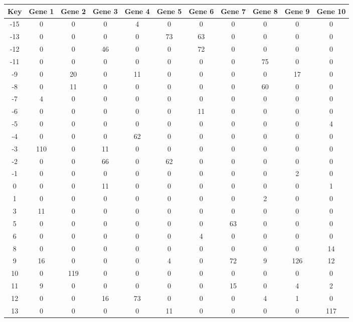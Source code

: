 \begin{tabular}{|c|c|c|c|c|c|c|c|c|c|c|}
\hline
Key & Gene 1 & Gene 2 & Gene 3 & Gene 4 & Gene 5 & Gene 6 & Gene 7 & Gene 8 & Gene 9 & Gene 10 \\
\hline
-15 & 0 & 0 & 0 & 4 & 0 & 0 & 0 & 0 & 0 & 0 \\
-13 & 0 & 0 & 0 & 0 & 73 & 63 & 0 & 0 & 0 & 0 \\
-12 & 0 & 0 & 46 & 0 & 0 & 72 & 0 & 0 & 0 & 0 \\
-11 & 0 & 0 & 0 & 0 & 0 & 0 & 0 & 75 & 0 & 0 \\
-9 & 0 & 20 & 0 & 11 & 0 & 0 & 0 & 0 & 17 & 0 \\
-8 & 0 & 11 & 0 & 0 & 0 & 0 & 0 & 60 & 0 & 0 \\
-7 & 4 & 0 & 0 & 0 & 0 & 0 & 0 & 0 & 0 & 0 \\
-6 & 0 & 0 & 0 & 0 & 0 & 11 & 0 & 0 & 0 & 0 \\
-5 & 0 & 0 & 0 & 0 & 0 & 0 & 0 & 0 & 0 & 4 \\
-4 & 0 & 0 & 0 & 62 & 0 & 0 & 0 & 0 & 0 & 0 \\
-3 & 110 & 0 & 11 & 0 & 0 & 0 & 0 & 0 & 0 & 0 \\
-2 & 0 & 0 & 66 & 0 & 62 & 0 & 0 & 0 & 0 & 0 \\
-1 & 0 & 0 & 0 & 0 & 0 & 0 & 0 & 0 & 2 & 0 \\
0 & 0 & 0 & 11 & 0 & 0 & 0 & 0 & 0 & 0 & 1 \\
1 & 0 & 0 & 0 & 0 & 0 & 0 & 0 & 2 & 0 & 0 \\
3 & 11 & 0 & 0 & 0 & 0 & 0 & 0 & 0 & 0 & 0 \\
5 & 0 & 0 & 0 & 0 & 0 & 0 & 63 & 0 & 0 & 0 \\
6 & 0 & 0 & 0 & 0 & 0 & 4 & 0 & 0 & 0 & 0 \\
8 & 0 & 0 & 0 & 0 & 0 & 0 & 0 & 0 & 0 & 14 \\
9 & 16 & 0 & 0 & 0 & 4 & 0 & 72 & 9 & 126 & 12 \\
10 & 0 & 119 & 0 & 0 & 0 & 0 & 0 & 0 & 0 & 0 \\
11 & 9 & 0 & 0 & 0 & 0 & 0 & 15 & 0 & 4 & 2 \\
12 & 0 & 0 & 16 & 73 & 0 & 0 & 0 & 4 & 1 & 0 \\
13 & 0 & 0 & 0 & 0 & 11 & 0 & 0 & 0 & 0 & 117 \\
\hline
\end{tabular}